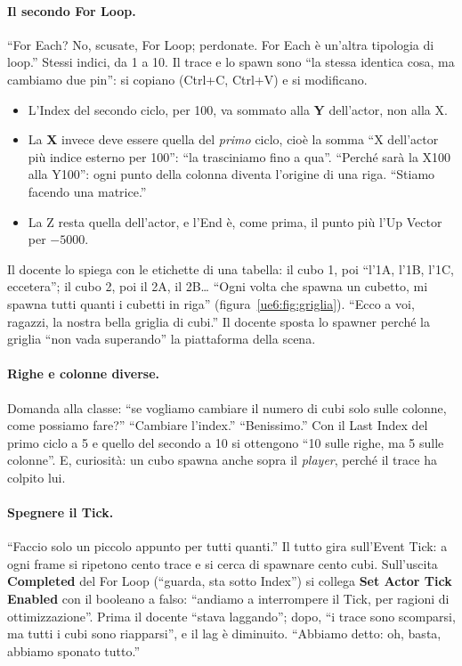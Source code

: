 \paragraph{Il secondo For Loop.} ``For Each? No, scusate, For Loop; perdonate. For Each è
un'altra tipologia di loop.'' Stessi indici, da 1 a 10. Il trace e lo spawn sono ``la
stessa identica cosa, ma cambiamo due pin'': si copiano (Ctrl+C, Ctrl+V) e si
modificano.
\begin{itemize}
  \item L'Index del secondo ciclo, per 100, va sommato alla \textbf{Y} dell'actor, non
        alla X.
  \item La \textbf{X} invece deve essere quella del \emph{primo} ciclo, cioè la somma
        ``X dell'actor più indice esterno per 100'': ``la trasciniamo fino a qua''.
        ``Perché sarà la X100 alla Y100'': ogni punto della colonna diventa l'origine di
        una riga. ``Stiamo facendo una matrice.''
  \item La Z resta quella dell'actor, e l'End è, come prima, il punto più l'Up Vector
        per $-5000$.
\end{itemize}
Il docente lo spiega con le etichette di una tabella: il cubo 1, poi ``l'1A, l'1B,
l'1C, eccetera''; il cubo 2, poi il 2A, il 2B\ldots{} ``Ogni volta che spawna un
cubetto, mi spawna tutti quanti i cubetti in riga'' (figura~\ref{ue6:fig:griglia}).
``Ecco a voi, ragazzi, la nostra bella griglia di cubi.'' Il docente sposta lo spawner
perché la griglia ``non vada superando'' la piattaforma della scena.

\paragraph{Righe e colonne diverse.} Domanda alla classe: ``se vogliamo cambiare il
numero di cubi solo sulle colonne, come possiamo fare?'' ``Cambiare l'index.''
``Benissimo.'' Con il Last Index del primo ciclo a 5 e quello del secondo a 10 si
ottengono ``10 sulle righe, ma 5 sulle colonne''. E, curiosità: un cubo spawna anche sopra
il \emph{player}, perché il trace ha colpito lui.

\paragraph{Spegnere il Tick.} ``Faccio solo un piccolo appunto per tutti quanti.'' Il
tutto gira sull'Event Tick: a ogni frame si ripetono cento trace e si cerca di spawnare
cento cubi. Sull'uscita \textbf{Completed} del For Loop (``guarda, sta sotto Index'')
si collega \textbf{Set Actor Tick Enabled} con il booleano a falso: ``andiamo a
interrompere il Tick, per ragioni di ottimizzazione''. Prima il docente ``stava
laggando''; dopo, ``i trace sono scomparsi, ma tutti i cubi sono riapparsi'', e il lag è
diminuito. ``Abbiamo detto: oh, basta, abbiamo sponato tutto.''

